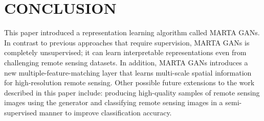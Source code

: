 \documentclass[journal]{IEEEtran}
\begin{document}
\vspace{-2mm}
\section{CONCLUSION}
\label{sec:discussion}
\vspace{-2mm}
This paper introduced a representation learning algorithm called MARTA GANs. In contrast to previous approaches that require supervision, MARTA GANs is completely unsupervised; it can learn interpretable representations even from challenging remote sensing datasets. In addition, MARTA GANs introduces a new multiple-feature-matching layer that learns multi-scale spatial information for high-resolution remote sensing. Other possible future extensions to the work described in this paper include: producing high-quality samples of remote sensing images using the generator and classifying remote sensing images in a semi-supervised manner to improve classification accuracy.














\end{document}
